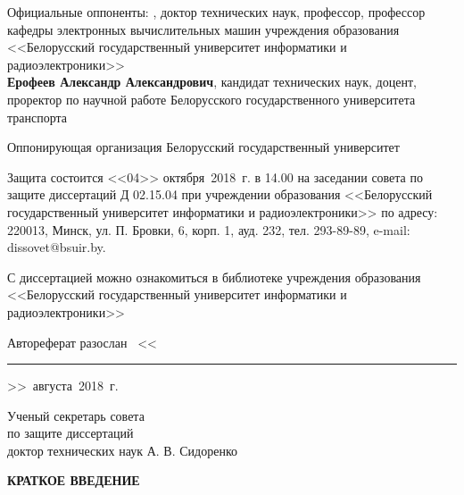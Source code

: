 \documentclass{thesisby}
\begin{document}
\vspace*{\fill} \noindent \hangindent=70mm  
    Официальные оппоненты: \hspace{10mm}{\bf Татур Михаил Михайлович}, доктор технических наук, профессор, профессор кафедры электронных вычислительных машин учреждения образования <<Белорусский государственный университет информатики и радиоэлектроники>> \\ [5pt]
    {\bf Ерофеев Александр Александрович}, кандидат технических наук, доцент, проректор по научной работе Белорусского государственного университета транспорта



\vspace*{\fill} \noindent \hangindent=66mm  Оппонирующая
организация \hspace{4mm} Белорусский государственный университет


\vspace*{\fill} \noindent Защита состоится <<04>> октября~2018~г. в 14.00
на заседании совета по защите диссертаций Д 02.15.04 при учреждении образования <<Белорусский государственный университет информатики и радиоэлектроники>> по адресу: 220013, Минск, ул. П. Бровки, 6, корп. 1, ауд. 232, тел. 293-89-89, e-mail: dissovet@bsuir.by.


\vspace*{\fill} \noindent
С диссертацией можно ознакомиться в библиотеке учреждения образования <<Белорусский государственный университет информатики и радиоэлектроники>>

\vspace*{\fill} \noindent
Автореферат разослан~
<<\rule{10mm}{0.4pt}>>~августа~2018~г.

\vspace*{\fill}

\noindent Ученый секретарь совета\\ по защите диссертаций\\ доктор технических наук \hfill А. В. Сидоренко

\vspace*{\fill}

\vspace*{\fill}

\newpage
\setcounter{page}{1}

\centerline{\bf КРАТКОЕ ВВЕДЕНИЕ}

\parindent=1cm

\medskip

\end{document}
